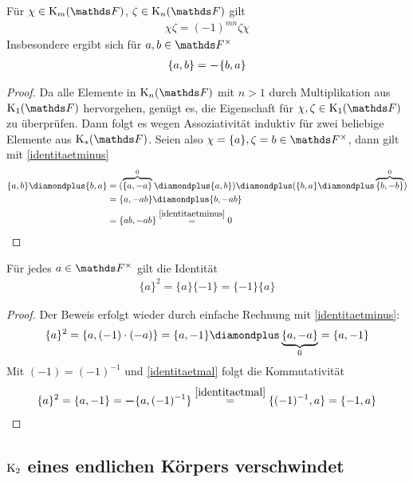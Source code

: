 \documentclass[ngerman,fontsize=11pt, paper=a4, parskip=half, titlepage=true, toc=bib]{scrartcl}
\begin{document}
\begin{Lem}\label{identitaetmal}
  Für $\chi\in\K_m(\F)$, $\zeta\in\K_n(\F)$ gilt
  \begin{gather*}
    \chi\zeta=(-1)^{mn}\zeta\chi
  \end{gather*}
  Insbesondere ergibt sich für $a,b\in \Fx$
  \begin{gather*}
    \{a,b\}= \boldsymbol -\{b,a\}
  \end{gather*}
  \begin{proof}
    Da alle Elemente in $\KnF$ mit $n>1$ durch Multiplikation aus
    $\KoF$ hervorgehen, genügt es, die Eigenschaft für
    $\chi,\zeta\in\KoF$ zu überprüfen. Dann folgt es wegen
    Assoziativität induktiv für zwei beliebige Elemente aus $\KF$.
    Seien also $\chi=\{a\},\zeta=b\in\Fx$, dann gilt mit \ref{identitaetminus}
    \begin{align*}
      \{a,b\}\p \{b,a\} 
      &= (\overbrace{\{a,-a\}}^{0} \p \{a,b\} )
        \p (\{b,a\} \p \overbrace{\{b,-b\}}^{0} ) \\
      &= \{ a,-ab \} \p \{b, -ab\}\\
      &= \{ ab, -ab\} \overset{\ref{identitaetminus}}{=} 0
    \end{align*}
  \end{proof}
\end{Lem}

\begin{Lem}\label{identitaetquadrat}
  Für jedes $a\in \Fx$ gilt die Identität
  \begin{gather*}
    \{a\}^2 = \{a\}\{-1\} = \{-1\}\{a\}
  \end{gather*}
  \begin{proof}
    Der Beweis erfolgt wieder durch einfache Rechnung mit
    \ref{identitaetminus}:
    \begin{gather*}
      \{a\}^2 = \{a,(-1)\cdot (-a)\} 
      = \{a,-1\}\p\underbrace{\{a,-a\}}_{0} = \{a,-1\}
    \end{gather*}
    Mit $(-1)=(-1)^{-1}$ und \ref{identitaetmal} folgt die Kommutativität
    \begin{gather*}
      \{a\}^2 = \{a,-1\}= \boldsymbol -\{a,(-1)^{-1}\} 
      \overset{\ref{identitaetmal}}{=} \{(-1)^{-1},a\} = \{-1,a\}
    \end{gather*}
  \end{proof}
\end{Lem}


\subsection{$\operatorname{K}_2$ eines endlichen Körpers verschwindet}
\end{document}
